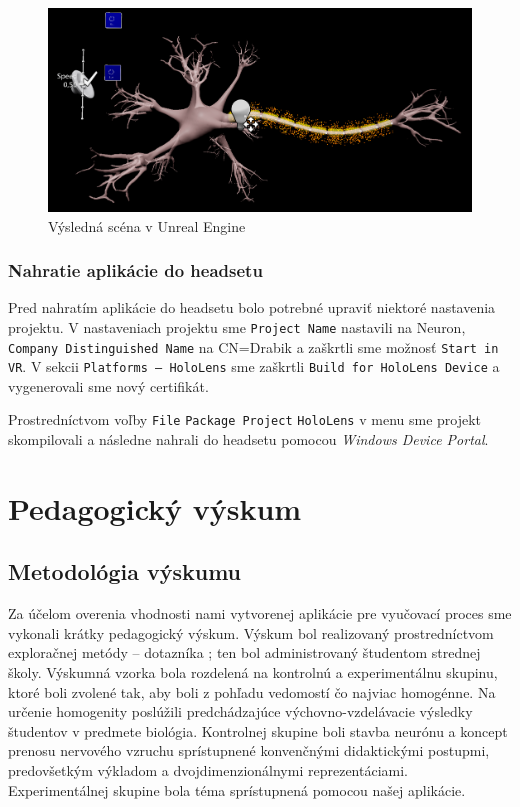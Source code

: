 \begin{figure}[!htbp]
  \centering
  \includegraphics[width=13cm]{img/scena.png}
  \caption{Výsledná scéna v Unreal Engine}
  \label{scena}
\end{figure}

\subsubsection{Nahratie aplikácie do headsetu}
Pred nahratím aplikácie do headsetu bolo potrebné upraviť niektoré nastavenia projektu. V nastaveniach projektu sme \texttt{Project Name} nastavili na Neuron, \texttt{Company Distinguished Name} na CN=Drabik a zaškrtli sme 
možnosť \texttt{Start in VR}. V sekcii \texttt{Platforms {--} HoloLens} sme zaškrtli \texttt{Build for HoloLens Device} a vygenerovali sme nový certifikát.

Prostredníctvom voľby \texttt{File} \to {} \texttt{Package Project} \to {} \texttt{HoloLens} v menu sme projekt skompilovali a následne nahrali do headsetu pomocou \emph{Windows Device Portal}.

\section{Pedagogický výskum}
\subsection{Metodológia výskumu}
Za účelom overenia vhodnosti nami vytvorenej aplikácie pre vyučovací proces sme vykonali krátky pedagogický výskum. Výskum bol realizovaný prostredníctvom exploračnej metódy {--} 
dotazníka \cite{svecMetodologieVedVychove2009}; ten bol administrovaný študentom strednej školy. Výskumná vzorka bola rozdelená na kontrolnú a experimentálnu skupinu, ktoré boli zvolené tak, aby boli z pohľadu vedomostí čo 
najviac homogénne. Na určenie homogenity poslúžili predchádzajúce výchovno-vzdelávacie výsledky študentov v predmete biológia. Kontrolnej skupine boli stavba neurónu a koncept prenosu nervového vzruchu sprístupnené
konvenčnými didaktickými postupmi, predovšetkým výkladom a dvojdimenzionálnymi reprezentáciami. Experimentálnej skupine bola téma sprístupnená pomocou našej aplikácie.

